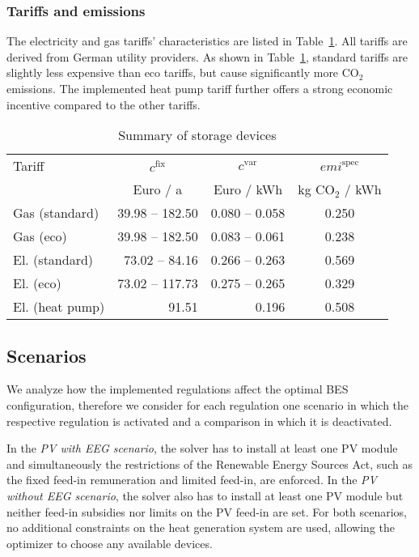 \subsubsection{Tariffs and emissions}

The electricity and gas tariffs' characteristics are listed in Table~\ref{tab: parameters tariffs}.
All tariffs are derived from German utility providers.
As shown in Table~\ref{tab: parameters tariffs}, standard tariffs are slightly less expensive than eco tariffs, but cause significantly more CO$_2$ emissions.
The implemented heat pump tariff further offers a strong economic incentive compared to the other tariffs.


\begin{table}[h!]
	\caption{Summary of storage devices}
	\centering
	\begin{tabular}[l]{@{}lccc}
		\hline
		Tariff 	& $c^\mathrm{fix}$	& $c^\mathrm{var}$ 		& $emi^\mathrm{spec}$ \\
		& Euro / a 	& Euro / kWh & kg CO$_2$ / kWh \\
		\hline
		Gas (standard) & \multicolumn{1}{r}{39.98 -- 182.50} & \multicolumn{1}{r}{0.080 -- 0.058} & 0.250 \\
		Gas (eco) & \multicolumn{1}{r}{39.98 -- 182.50} & \multicolumn{1}{r}{0.083 -- 0.061} & 0.238 \\
		\hline
		El. (standard) & \multicolumn{1}{r}{73.02 -- 84.16} & 0.266 -- 0.263 & 0.569 \\
		El. (eco) & \multicolumn{1}{r}{73.02 -- 117.73} & \multicolumn{1}{r}{0.275 -- 0.265} & 0.329 \\
		El. (heat pump) & \multicolumn{1}{r}{91.51}  & \multicolumn{1}{r}{0.196} & 0.508 \\
		\hline
	\end{tabular}
	\label{tab: parameters tariffs}
\end{table}

\subsection{Scenarios}

We analyze how the implemented regulations affect the optimal BES configuration, therefore we consider for each regulation one scenario in which the respective regulation is activated and a comparison in which it is deactivated.

In the \emph{PV with EEG scenario}, the solver has to install at least one PV module and simultaneously the restrictions of the Renewable Energy Sources Act, such as the fixed feed-in remuneration and limited feed-in, are enforced.
In the \emph{PV without EEG scenario}, the solver also has to install at least one PV module but neither feed-in subsidies nor limits on the PV feed-in are set.
For both scenarios, no additional constraints on the heat generation system are used, allowing the optimizer to choose any available devices.


